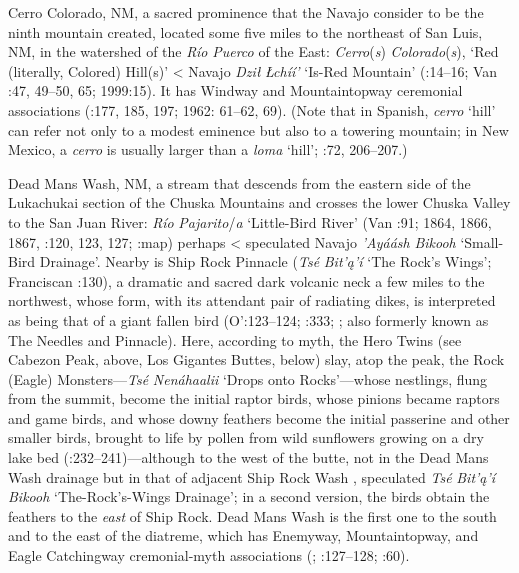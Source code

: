 Cerro Colorado, NM, a sacred prominence that the Navajo consider to be the ninth mountain created, located some five miles to the northeast of San Luis, NM, in the watershed of the \textit{Río} \textit{Puerco} of the East:  \textit{Cerro}(\textit{s}) \textit{Colorado}(\textit{s}), ‘Red (literally, Colored) Hill(s)’ < Navajo \textit{Dził} \textit{Łchíí’} ‘Is-Red Mountain’ (\citealt{Fishler1953}:14–16; Van \citealt{Valkenburgh1974}:47, 49–50, 65; 1999:15).  It has Windway and Mountaintopway ceremonial associations (\citealt{Wyman1975}:177, 185, 197; 1962: 61–62, 69).  (Note that in Spanish, \textit{cerro} ‘hill’ can refer not only to a modest eminence but also to a towering mountain; in New Mexico, a \textit{cerro} is usually larger than a \textit{loma} ‘hill’; \citealt{Julyan1998}:72, 206–207.)

Dead Mans Wash, NM, a stream that descends from the eastern side of the Lukachukai section of the Chuska Mountains and crosses the lower Chuska Valley to the San Juan River:  \textit{Río} \textit{Pajarito}/\textit{a} ‘Little-Bird River’ (Van \citealt{ValkenburghWalker1945}:91; 1864, 1866, 1867, \citealt{Eidenbach2012}:120, 123, 127; \citealt{Madsen2010}:map) perhaps < speculated Navajo \textit{’Ayáásh} \textit{Bikooh}  ‘Small-Bird Drainage’.  Nearby is Ship Rock Pinnacle (\textit{Tsé} \textit{Bit'ą'í} ‘The Rock’s Wings’; Franciscan \citealt{Fathers1910}:130), a dramatic and sacred dark volcanic neck a few miles to the northwest, whose form, with its attendant pair of radiating dikes, is interpreted as being that of a giant fallen bird (O'\citealt{Bryan1956}:123–124; \citealt{Julyan1998}:333; \citealt{Begay2015b}; also formerly known as The Needles and Pinnacle).  Here, according to myth, the Hero Twins (see Cabezon Peak, above, Los Gigantes Buttes, below) slay, atop the peak, the Rock (Eagle) Monsters—\textit{Tsé} \textit{Nenáhaalii}  ‘Drops onto Rocks’—whose nestlings, flung from the summit, become the initial raptor birds, whose pinions became raptors and game birds, and whose downy feathers become the initial passerine and other smaller birds, brought to life by pollen from wild sunflowers growing on a dry lake bed (\citealt{Zolbrod1984}:232–241)—although to the west of the butte, not in the Dead Mans Wash drainage but in that of adjacent Ship Rock Wash \citep{Newcomb1970}, speculated \textit{Tsé} \textit{Bit'ą'í} \textit{Bikooh} ‘The-Rock’s-Wings Drainage’; in a second version, the birds obtain the feathers to the \textit{east} of Ship Rock.  Dead Mans Wash is the first one to the south and to the east of the diatreme, which has Enemyway, Mountaintopway, and Eagle Catchingway cremonial-myth associations (\citealt{Haile1938}; \citealt{KluckhohnLeighton1946}:127–128; \citealt{Fishler1953}:60).  


